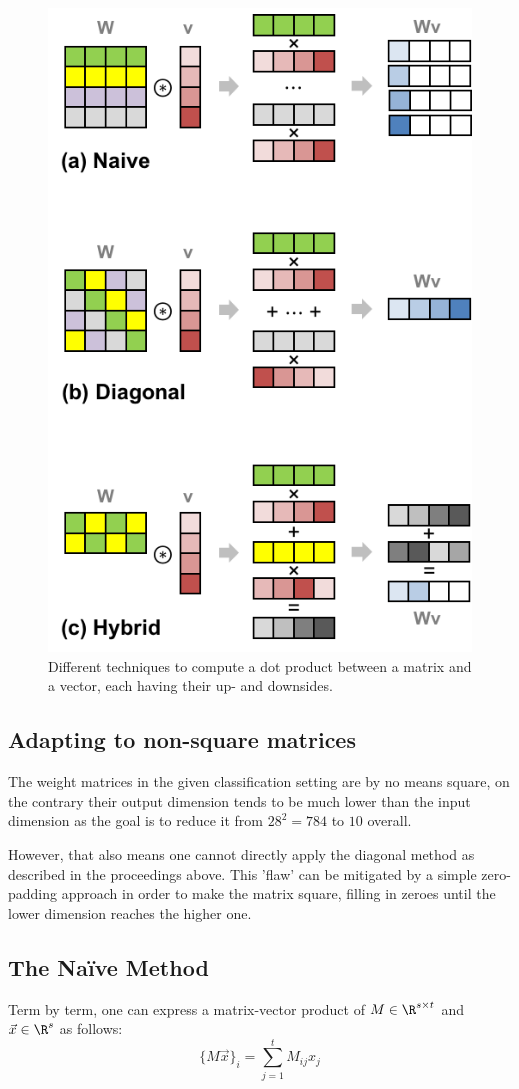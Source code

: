 \begin{figure}
  \centering
  \includegraphics[width=0.4\linewidth]{figures/matrix-vector-multiplication-techniques.png}
  \caption[Image source: \cite{2018-gazelle}]{Different techniques to compute a dot product between a matrix and a vector,
    each having their up- and downsides.}
\end{figure}

\subsection{Adapting to non-square matrices}
\label{subsec:non-square-matrices}
The weight matrices in the given classification setting
are by no means square, on the contrary their output dimension tends
to be much lower than the input dimension as the goal is to reduce it from
$28^2 = 784$ to $10$ overall.

However, that also means one cannot directly apply the diagonal method
as described in the proceedings above.
This 'flaw' can be mitigated by a simple zero-padding approach
in order to make the matrix square, filling in zeroes until
the lower dimension reaches the higher one.

\subsection{The Naïve Method}
Term by term, one can express a matrix-vector product of $M \in \R^{s \times t}$ and
$\vec{x} \in \R^s$ as follows:
$$\{M \vec{x}\}_i = \sum_{j=1}^{t} M_{ij} x_j$$

